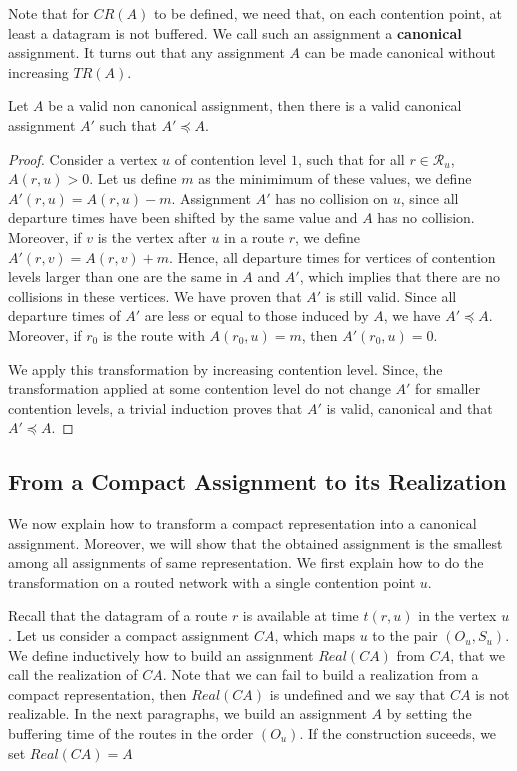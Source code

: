 \documentclass[english]{article}
\begin{document}
Note that for $CR(A)$ to be defined, we need that, on each contention point, at least a datagram is not buffered. We call such an assignment a \textbf{canonical} assignment. It turns out that any assignment $A$ can be made canonical without increasing $TR(A)$.

\begin{lemma}\label{lemma:canonical_min}
Let $A$ be a valid non canonical assignment, then there is a valid canonical assignment $A'$ such that $A' \preceq A$.
\end{lemma}
\begin{proof}
Consider a vertex $u$ of contention level $1$, such that for all $r \in \mathcal{R}_u$, $A(r,u) > 0$. Let us define $m$ as the minimimum of these values, we define $A'(r,u) = A(r,u) - m$. Assignment $A'$ has no collision on $u$, since all departure times have been shifted by the same value and $A$ has no collision. Moreover, if $v$ is the vertex after $u$ in a route $r$, we define  $A'(r,v) = A(r,v) + m$. Hence, all departure times for vertices of contention levels larger than one are the same in $A$ and $A'$, which implies that there are no collisions in these vertices. We have proven that $A'$ is still valid. Since all departure times of $A'$ are less or equal to those induced by $A$, we have $A' \preceq A$. Moreover, if $r_0$ is the route with $A(r_0,u) = m$, then $A'(r_0,u) = 0$. 

We apply this transformation by increasing contention level. Since, the transformation applied at some contention level do not change $A'$ for smaller contention levels, a trivial induction proves that $A'$ is valid, canonical and that $A' \preceq A$.
\end{proof}


\subsection{From a Compact Assignment to its Realization}


We now explain how to transform a compact representation into a canonical assignment.
Moreover, we will show that the obtained assignment is the smallest among all assignments of same representation. We first explain how to do the transformation on a routed network with a single contention point $u$.

Recall that the datagram of a route $r$ is available at time $t(r,u)$ in the vertex $u$.
Let us consider a compact assignment $CA$, which maps $u$ to the pair $(O_u,S_u)$.
We define inductively how to build an assignment $Real(CA)$ from $CA$, that we call the realization of $CA$. Note that we can fail to build a realization from a compact representation, then $Real(CA)$ is undefined and we say that $CA$ is not realizable. In the next paragraphs, we build an assignment $A$ by setting the buffering time of the routes in the order
 $(O_u)$. If the construction suceeds, we set $Real(CA) = A$ 
\end{document}
